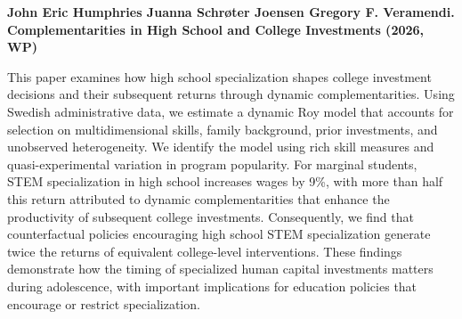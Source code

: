 \documentclass[11pt]{article}
\newcommand{\entry}[3]{%
  \par\medskip\noindent\textbf{#1}\par
  \nopagebreak #2\hspace{0.35em}{\small\color{tagcol}[#3]}\par}
\begin{document}
\entry{John Eric Humphries Juanna Schrøter Joensen Gregory F. Veramendi. Complementarities in High School  and College Investments (2026, WP)}
{This paper examines how high school specialization shapes college investment decisions and their subsequent returns through dynamic complementarities. Using Swedish administrative data, we estimate a dynamic Roy model that accounts for selection on multidimensional skills, family background, prior investments, and unobserved heterogeneity. We identify the model using rich skill measures and quasi-experimental variation in program popularity. For marginal students, STEM specialization in high school increases wages by 9\%, with more than half this return attributed to dynamic complementarities that enhance the productivity of subsequent college investments. Consequently, we find that counterfactual policies encouraging high school STEM specialization generate twice the returns of equivalent college-level interventions. These findings demonstrate how the timing of specialized human capital investments matters during adolescence, with important implications for education policies that encourage or restrict specialization.}{REV}
\end{document}
